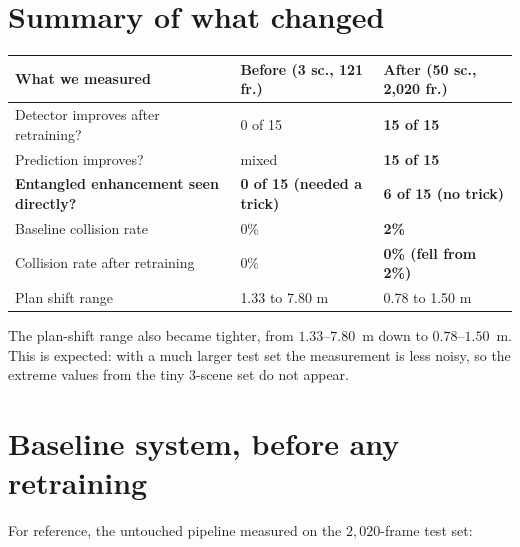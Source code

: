 \documentclass[11pt,a4paper]{article}
\begin{document}
\section{Summary of what changed}

\begin{table}[h!]
\centering
\renewcommand{\arraystretch}{1.3}
\begin{tabular}{@{}L{6.3cm}C{3.2cm}C{3.5cm}@{}}
\toprule
\textbf{What we measured} & \textbf{Before (3 sc., 121 fr.)} & \textbf{After (50 sc., 2{,}020 fr.)} \\
\midrule
Detector improves after retraining?           & 0 of 15 & \textbf{15 of 15} \\
Prediction improves?                           & mixed   & \textbf{15 of 15} \\
\textbf{Entangled enhancement seen directly?}  & \textbf{0 of 15 (needed a trick)} & \textbf{6 of 15 (no trick)} \\
Baseline collision rate                        & 0\% & \textbf{2\%} \\
Collision rate after retraining                & 0\% & \textbf{0\% (fell from 2\%)} \\
Plan shift range                               & 1.33 to 7.80 m & 0.78 to 1.50 m \\
\bottomrule
\end{tabular}
\end{table}

\noindent
The plan-shift range also became tighter, from $1.33$--$7.80$~m down to
$0.78$--$1.50$~m. This is expected: with a much larger test set the measurement
is less noisy, so the extreme values from the tiny $3$-scene set do not appear.

\section{Baseline system, before any retraining}

For reference, the untouched pipeline measured on the $2{,}020$-frame test set:
\end{document}
